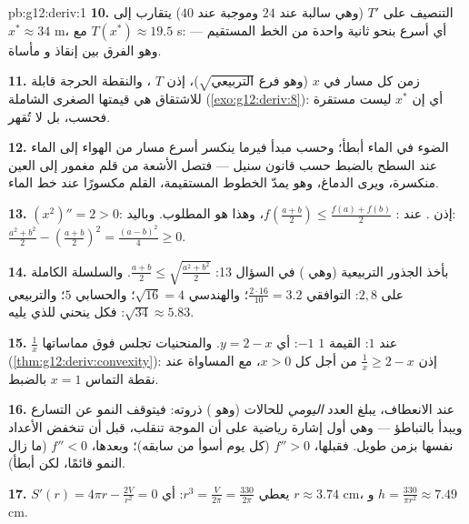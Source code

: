 \begin{solution}{pb:g12:deriv:1}
\textbf{10.} التنصيف على $T'$ (وهي سالبة عند $24$ وموجبة عند
$40$) يتقارب إلى $x^* \approx 34$ m، مع
$T(x^*) \approx 19.5$ s: أي أسرع بنحو ثانية واحدة من
الخط المستقيم --- وهو الفرق بين إنقاذ و
مأساة.

\textbf{11.} زمن كل مسار   في $x$
(وهو فرع $\sqrt{\text{التربيعي}}$)، إذن $T$ ، والنقطة
الحرجة   قابلة للاشتقاق هي قيمتها
الصغرى الشاملة (\cref{exo:g12:deriv:8}): أي إن $x^*$ ليست
مستقرة فحسب، بل لا تُقهر.

\textbf{12.} الضوء في الماء أبطأ؛ وحسب مبدأ فيرما
ينكسر أسرع مسار من الهواء إلى الماء عند السطح بالضبط
حسب قانون سنيل --- فتصل الأشعة من قلم مغمور إلى العين
منكسرة، ويرى الدماغ، وهو يمدّ الخطوط المستقيمة، القلم
مكسورًا عند خط الماء.

\textbf{13.} $(x^2)'' = 2 > 0$: إذن .  عند
: $f\left(\frac{a+b}{2}\right) \leq
\frac{f(a) + f(b)}{2}$، وهذا هو المطلوب. وباليد:
$\frac{a^2 + b^2}{2} - \left(\frac{a+b}{2}\right)^2 =
\frac{(a - b)^2}{4} \geq 0$.

\textbf{14.} بأخذ الجذور التربيعية (وهي ) في السؤال 13:
$\frac{a + b}{2} \leq \sqrt{\frac{a^2 + b^2}{2}}$. والسلسلة الكاملة
على $2, 8$: التوافقي $\frac{2 \cdot 16}{10} = 3.2$؛ والهندسي
$\sqrt{16} = 4$؛ والحسابي $5$؛ والتربيعي
$\sqrt{34} \approx 5.83$: فكل  ينحني للذي يليه.

\textbf{15.}   $\frac1x$ عند $1$: القيمة $1$ 
$-1$: أي $y = 2 - x$. والمنحنيات  تجلس فوق مماساتها
(\cref{thm:g12:deriv:convexity}): إذن $\frac1x \geq 2 - x$ من أجل كل
$x > 0$، مع المساواة عند نقطة التماس $x = 1$ بالضبط.

\textbf{16.} عند الانعطاف، يبلغ العدد \emph{اليومي} للحالات
(وهو ) ذروته: فيتوقف النمو عن التسارع ويبدأ
بالتباطؤ --- وهي أول إشارة رياضية على أن الموجة
تنقلب، قبل أن تنخفض الأعداد نفسها بزمن طويل. فقبلها،
$f'' > 0$ (كل يوم أسوأ من سابقه)؛ وبعدها،
$f'' < 0$ (ما زال النمو قائمًا، لكن أبطأ).

\textbf{17.} $S'(r) = 4\pi r - \frac{2V}{r^2} = 0$ يعطي
$r^3 = \frac{V}{2\pi} = \frac{330}{2\pi}$:
أي $r \approx 3.74$ cm، و
$h = \frac{330}{\pi r^2} \approx 7.49$ cm.


\end{solution}
